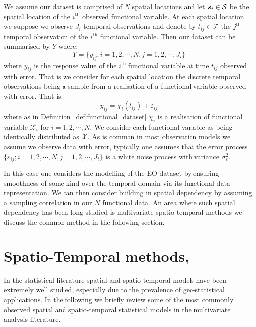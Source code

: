 We assume our dataset is comprised of $N$ spatial locations and let $\bm{{s}}_i \in \mathcal{S}$ be the spatial location of the $i^\text{th}$ observed functional variable.
At each spatial location we suppose we observe $J_i$ temporal observations and denote by $t_{ij} \in \mathcal{T}$ the $j^\text{th}$ temporal observation of the $i^\text{th}$ functional variable.
Then our dataset can be summarised by $Y$ where:
\begin{equation}
	Y = \{ y_{ij}; i=1,2,\cdots,N, j=1,2, \cdots, J_i \}
	\label{eqn:observed_data}
\end{equation}
where $y_{ij}$ is the response value of the $i^\text{th}$ functional variable at time $t_{ij}$ observed with error.
That is we consider for each spatial location the discrete temporal observations being a sample from a realisation of a functional variable observed with error.
That is:
\begin{equation}
	y_{ij} = \chi_{i}\left( t_{ij} \right) + \varepsilon_{ij}
	\label{eqn:fd_temporal}
\end{equation}
where as in Definition~\ref{def:functional_dataset} $\chi_i$ is a realisation of functional variable $\mathcal{X}_i$ for $i=1,2,\cdots,N$.
We consider each functional variable as being identically distributed as $\mathcal{X}$.
As is common in most observation models we assume we observe data with error, typically one assumes that the error process $\{\varepsilon_{ij}; i=1,2,\cdots,N, j=1,2,\cdots,J_i\}$ is a white noise process with variance $\sigma_\varepsilon^2$. 

In this case one considers the modelling of the EO dataset by ensuring smoothness of some kind over the temporal domain via its functional data representation.
We can then consider building in spatial dependency by assuming a sampling correlation in our $N$ functional data.
An area where such spatial dependency has been long studied is multivariate spatio-temporal methods we discuss the common method in the following section. 

\section{Spatio-Temporal methods, \label{sec:st_methods}}
In the statistical literature spatial and spatio-temporal models have been extremely well studied, especially due to the prevalence of geo-statistical applications.
In the following we briefly review some of the most commonly observed spatial and spatio-temporal statistical models in the multivariate analysis literature. 

